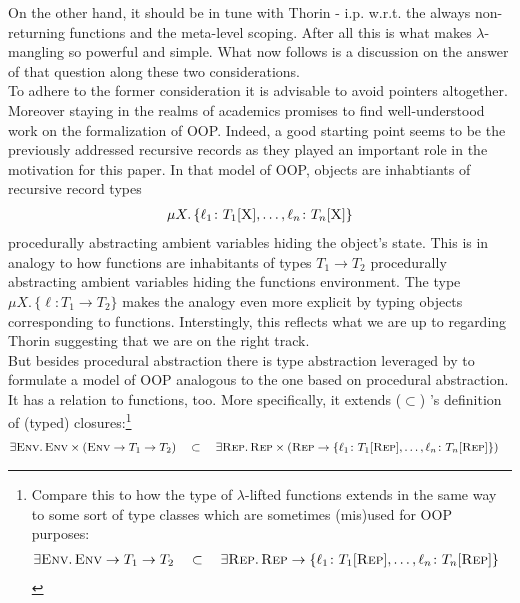 On the other hand, it should be in tune with Thorin - i.p. w.r.t. the always non-returning functions and the meta-level scoping.
After all this is what makes $\lambda$-mangling so powerful and simple.
What now follows is a discussion on the answer of that question along these two considerations.
\\
To adhere to the former consideration it is advisable to avoid pointers altogether.
Moreover staying in the realms of academics promises to find well-understood work on the formalization of OOP.
Indeed, a good starting point seems to be the previously addressed recursive records as they played an important role in the motivation for this paper.
In that model of OOP, objects are inhabtiants of recursive record types
\begin{align*}
  \mu X
  .\,
  \lbrace
    \ell_{1} \colon T_{1}[\textsc{X}],
    \ldots,
    \ell_{n} \colon T_{n}[\textsc{X}]
  \rbrace
\end{align*}
procedurally abstracting ambient variables hiding the object's state.
This is in analogy to how functions are inhabitants of types $T_{1} \to T_{2}$ procedurally abstracting ambient variables hiding the functions environment.
The type $\mu X.\, \lbrace \ell \colon T_{1} \to T_{2} \rbrace$ makes the analogy even more explicit by typing objects corresponding to functions.
Interstingly, this reflects what we are up to regarding Thorin suggesting that we are on the right track.
\\
But besides procedural abstraction there is type abstraction leveraged by \cite{pierce} to formulate a model of OOP analogous to the one based on procedural abstraction.
It has a relation to functions, too.
More specifically, it extends ($\subset$) \cite{harper}'s definition of (typed) closures:\footnote{
  Compare this to how the type of $\lambda$-lifted functions extends in the same way to some sort of type classes which are sometimes (mis)used for OOP purposes:
\begin{align*}
  \exists
  \textsc{Env}
  .\,
  \textsc{Env} \to T_{1} \to T_{2}
  \quad
  &\subset
  \quad
  \exists
  \textsc{Rep}
  .\,
  \textsc{Rep}
  \to
  \lbrace
    \ell_{1} \colon T_{1}[\textsc{Rep}],
    \ldots,
    \ell_{n} \colon T_{n}[\textsc{Rep}]
  \rbrace
\end{align*}
}
\begin{align*}
  \exists
  \textsc{Env}
  .\,
  \textsc{Env}
  \times
  \left(
    \textsc{Env} \to T_{1} \to T_{2}
  \right)
  \quad
  &\subset
  \quad
  \exists
  \textsc{Rep}
  .\,
  \textsc{Rep}
  \times
  \left(
    \textsc{Rep}
    \to
    \lbrace
      \ell_{1} \colon T_{1}[\textsc{Rep}],
      \ldots,
      \ell_{n} \colon T_{n}[\textsc{Rep}]
    \rbrace
  \right)
\end{align*}
